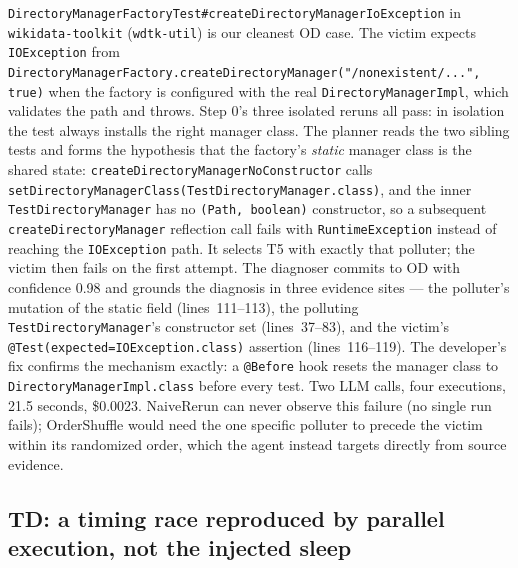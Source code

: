 \texttt{DirectoryManagerFactoryTest\#createDirectoryManagerIoException} in
\texttt{wikidata-toolkit} (\texttt{wdtk-util}) is our cleanest OD case. The
victim expects \texttt{IOException} from
\texttt{DirectoryManagerFactory.createDirectoryManager("/nonexistent/...", true)}
when the factory is configured with the real
\texttt{DirectoryManagerImpl}, which validates the path and throws. Step 0's
three isolated reruns all pass: in isolation the test always installs the
right manager class. The planner reads the two sibling tests and forms the
hypothesis that the factory's \emph{static} manager class is the shared
state: \texttt{createDirectoryManagerNoConstructor} calls
\texttt{setDirectoryManagerClass(TestDirectoryManager.class)}, and the inner
\texttt{TestDirectoryManager} has no \texttt{(Path, boolean)} constructor, so
a subsequent \texttt{createDirectoryManager} reflection call fails with
\texttt{RuntimeException} instead of reaching the \texttt{IOException} path.
It selects T5 with exactly that polluter; the victim then fails on the first
attempt. The diagnoser commits to OD with confidence 0.98 and grounds the
diagnosis in three evidence sites --- the polluter's mutation of the static
field (lines~111--113), the polluting \texttt{TestDirectoryManager}'s
constructor set (lines~37--83), and the victim's
\texttt{@Test(expected=IOException.class)} assertion (lines~116--119).
The developer's fix confirms the mechanism exactly: a
\texttt{@Before} hook resets the manager class to
\texttt{DirectoryManagerImpl.class} before every test. Two LLM calls, four
executions, 21.5 seconds, \$0.0023. NaiveRerun can never observe this failure
(no single run fails); OrderShuffle would need the one specific polluter to
precede the victim within its randomized order, which the agent instead
targets directly from source evidence.

\subsection{TD: a timing race reproduced by parallel execution, not the injected sleep}
\label{sec:case-td}

